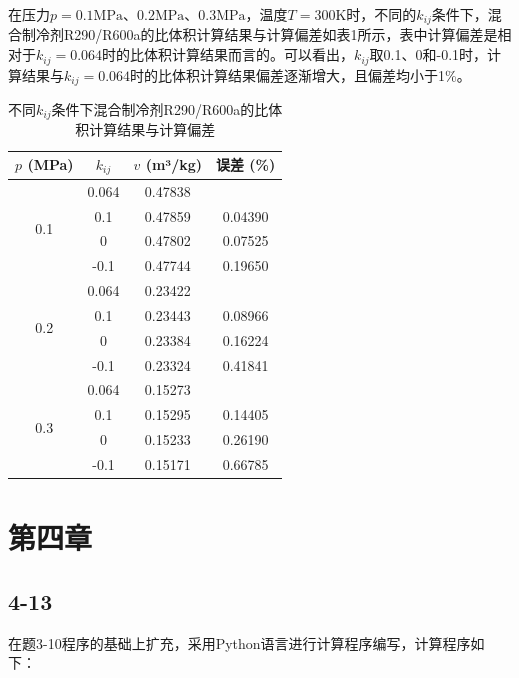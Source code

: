 \documentclass[12pt,a4paper]{article}
\begin{document}
在压力$p=0.1\mathrm{MPa}$、$0.2\mathrm{MPa}$、$0.3\mathrm{MPa}$，温度$T=300\mathrm{K}$时，不同的$k_{ij}$条件下，混合制冷剂R290/R600a的比体积计算结果与计算偏差如表1所示，表中计算偏差是相对于$k_{ij}=0.064$时的比体积计算结果而言的。可以看出，$k_{ij}$取0.1、0和-0.1时，计算结果与$k_{ij}=0.064$时的比体积计算结果偏差逐渐增大，且偏差均小于1\%。
\begin{table}[h]
\centering
\begin{tabular}{c c c c}
\hline
$p$ (MPa) & $k_{ij}$ &  $v$ (m³/kg) &误差 (\%) \\
\hline
\multirow{4}{*}{0.1} & 0.064 & 0.47838 &   \\
 & 0.1 & 0.47859 & 0.04390\\
 & 0 & 0.47802 & 0.07525  \\
 & -0.1 & 0.47744 & 0.19650  \\
\hline
\multirow{4}{*}{0.2} & 0.064 & 0.23422 &   \\
 & 0.1 & 0.23443 & 0.08966  \\
 & 0 & 0.23384 & 0.16224  \\
 & -0.1 & 0.23324 & 0.41841  \\
\hline
\multirow{4}{*}{0.3} & 0.064 & 0.15273 &   \\
 & 0.1 & 0.15295 & 0.14405  \\
 & 0 & 0.15233 & 0.26190  \\
 & -0.1 & 0.15171 & 0.66785  \\
\hline
\end{tabular}
\caption{不同$k_{ij}$条件下混合制冷剂R290/R600a的比体积计算结果与计算偏差}

\end{table}

\newpage

\section*{第四章}

\subsection*{4-13}

在题3-10程序的基础上扩充，采用Python语言进行计算程序编写，计算程序如下：
\end{document}
